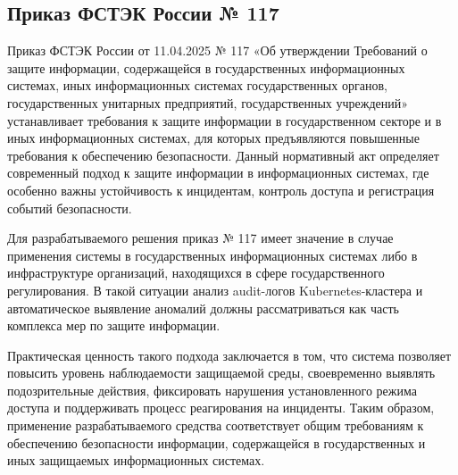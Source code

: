 \subsection{Приказ ФСТЭК России № 117}

Приказ ФСТЭК России от 11.04.2025 № 117 «Об утверждении Требований о защите информации, содержащейся в государственных информационных системах, иных информационных системах государственных органов, государственных унитарных предприятий, государственных учреждений» \cite{FSTEK117} устанавливает требования к защите информации в государственном секторе и в иных информационных системах, для которых предъявляются повышенные требования к обеспечению безопасности. Данный нормативный акт определяет современный подход к защите информации в информационных системах, где особенно важны устойчивость к инцидентам, контроль доступа и регистрация событий безопасности.

Для разрабатываемого решения приказ № 117 имеет значение в случае применения системы в государственных информационных системах либо в инфраструктуре организаций, находящихся в сфере государственного регулирования. В такой ситуации анализ audit-логов Kubernetes-кластера и автоматическое выявление аномалий должны рассматриваться как часть комплекса мер по защите информации.

Практическая ценность такого подхода заключается в том, что система позволяет повысить уровень наблюдаемости защищаемой среды, своевременно выявлять подозрительные действия, фиксировать нарушения установленного режима доступа и поддерживать процесс реагирования на инциденты. Таким образом, применение разрабатываемого средства соответствует общим требованиям к обеспечению безопасности информации, содержащейся в государственных и иных защищаемых информационных системах.